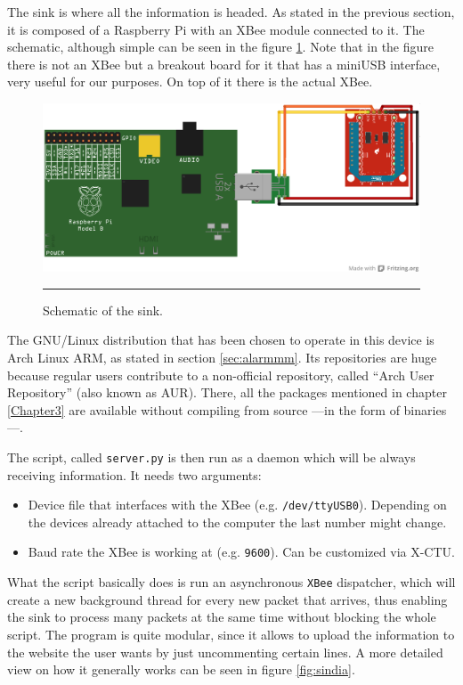The sink is where all the information is headed. As stated in the previous section, it is composed of a Raspberry Pi with an XBee module connected to it. The schematic, although simple can be seen in the figure \ref{fig:sinkrpi}. Note that in the figure there is not an XBee but a breakout board for it that has a miniUSB interface, very useful for our purposes. On top of it there is the actual XBee\textregistered{}.

\begin{figure}[htbp]
    \centering
        \includegraphics[scale=0.7]{./Figures/server_side.png}
        \rule{35em}{0.5pt}
    \caption[Raspberry Pi based sink]{Schematic of the sink.}
    \label{fig:sinkrpi}
\end{figure}

The GNU/Linux distribution that has been chosen to operate in this device is Arch Linux ARM, as stated in section \ref{sec:alarmmm}. Its repositories are huge because regular users contribute to a non-official repository, called ``Arch User Repository'' (also known as AUR). There, all the packages mentioned in chapter \ref{Chapter3} are available without compiling from source ---in the form of binaries---.

The script, called \texttt{server.py} is then run as a daemon which will be always receiving information. It needs two arguments:

\begin{itemize}
    \item Device file that interfaces with the XBee\textregistered{} (e.g. \texttt{/dev/ttyUSB0}). Depending on the devices already attached to the computer the last number might change.
    \item Baud rate the XBee\textregistered{} is working at (e.g. \texttt{9600}). Can be customized via X-CTU.
\end{itemize}

What the script basically does is run an asynchronous \texttt{XBee} dispatcher, which will create a new background thread for every new packet that arrives, thus enabling the sink to process many packets at the same time without blocking the whole script. The program is quite modular, since it allows to upload the information to the website the user wants by just uncommenting certain lines. A more detailed view on how it generally works can be seen in figure \ref{fig:sindia}.

